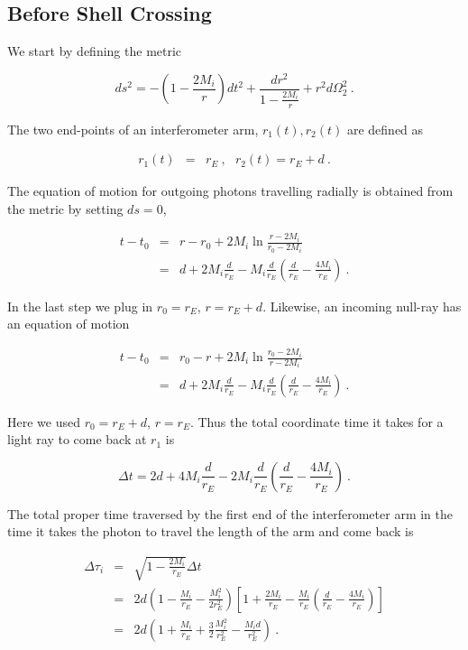 \documentclass[aps,showpacs,twocolumn,floats,prd,superscriptaddress,nofootinbib]{revtex4-1}
\begin{document}
\subsection{Before Shell Crossing}

We start by defining the metric

\begin{equation}
ds^2 = -\left(1-\frac{2M_i}{r}\right)dt^2 + \frac{dr^2}{1-\frac{2M_i}{r}}+r^2d\Omega_2^2~.
\end{equation}

The two end-points of an interferometer arm, $r_1(t), r_2(t)$ are defined as

\begin{eqnarray}
r_1(t) &=& r_{E}~, \ \ \ r_2(t) = r_{E}+d~.
\end{eqnarray}

The equation of motion for outgoing photons travelling radially is obtained from the metric by setting $ds=0$,

\begin{eqnarray}
t-t_0 &=& r-r_0 + 2M_i\ln\frac{r-2M_i}{r_0-2M_i} \\ \nonumber
&=& d + 2M_i\frac{d}{r_E} -M_i\frac{d}{r_E}
\left( \frac{d}{r_E}-\frac{4M_i}{r_E} \right)~.
\label{eq-dt1}
\end{eqnarray}

In the last step we plug in $r_0=r_E$, $r = r_E+d$. Likewise, an incoming null-ray has an equation of motion

\begin{eqnarray}
t-t_0 &=& r_0-r + 2M_i\ln\frac{r_0-2M_i}{r-2M_i} \\ \nonumber
&=& d + 2M_i\frac{d}{r_E} - M_i\frac{d}{r_E}
\left( \frac{d}{r_E}-\frac{4M_i}{r_E} \right) ~.
\end{eqnarray}

Here we used $r_0 = r_E+d$, $r = r_E$. Thus the total coordinate time it takes for a light ray to come back at $r_1$ is

\begin{equation}
\Delta t = 2d + 4M_i\frac{d}{r_E} - 2M_i\frac{d}{r_E}
\left( \frac{d}{r_E}-\frac{4M_i}{r_E} \right)~.
\end{equation}

The total proper time traversed by the first end of the interferometer arm in the time it takes the photon to travel the length of the arm and come back is 

\begin{eqnarray}
\Delta \tau_i &=& \sqrt{1-\frac{2M_i}{r_E}}\Delta t  \\ \nonumber
&=& 2d \left(1-\frac{M_i}{r_E} - \frac{M_i^2}{2r_E^2}\right) 
\left[ 1+\frac{2M_i}{r_E} - \frac{M_i}{r_E}\left( \frac{d}{r_E} - \frac{4M_i}{r_E} \right) \right] \\ \nonumber
&=& 2d
\left(1 + \frac{M_i}{r_E} + \frac{3}{2}\frac{M_i^2}{r_E^2} - \frac{M_id}{r_E^2}\right)~.
\end{eqnarray}
\end{document}
